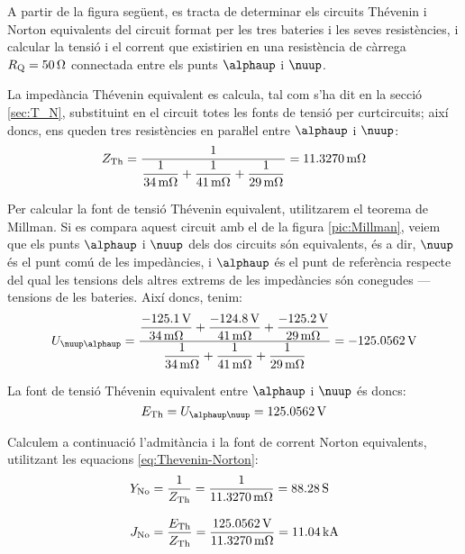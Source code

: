 \begin{exemple}\label{ex:MillmanBateries}
	\addcontentsxms{\MillmanBateries}
    A partir de la figura següent, es tracta de determinar els circuits
    Thévenin i Norton equivalents del circuit format per les tres
    bateries i les seves resistències, i calcular la tensió i el
    corrent que existirien en una resistència de càrrega
    $R_\mathrm{Q}=\qty{50}{\ohm}$ connectada entre els punts $\alphaup$
    i $\nuup$.

    \begin{center}
        
    \end{center}

    La impedància Thévenin equivalent es calcula, tal com s'ha dit en la secció \ref{sec:T_N},
    substituint en el circuit totes les fonts de tensió per curtcircuits; així doncs, ens
    queden tres resistències en paraŀlel entre $\alphaup$ i $\nuup$:
    \[
    Z_\mathrm{Th} = \frac{1}{\dfrac{1}{\qty{34}{\milli\ohm}} +
    \dfrac{1}{\qty{41}{\milli\ohm}} + \dfrac{1}{\qty{29}{\milli\ohm}}} =
    \qty{11,3270}{\milli\ohm}
    \]

    Per calcular la font de tensió Thévenin equivalent, utilitzarem el
    teorema de Millman. Si es compara aquest circuit amb el de la figura
    \vref{pic:Millman}, veiem que els punts $\alphaup$ i $\nuup$ dels dos
    circuits són equivalents, és a dir, $\nuup$ és el punt comú de les
    impedàncies, i $\alphaup$ és el punt de referència respecte del qual les tensions  dels altres extrems de les impedàncies
    són conegudes ---
    tensions de les bateries. Així doncs, tenim:
    \[
    U_{\nuup\alphaup} = \frac{\dfrac{\qty{-125,1}{V}}{\qty{34}{m\ohm}} +
    \dfrac{\qty{-124,8}{V}}{\qty{41}{m\ohm}} +
    \dfrac{\qty{-125,2}{V}}{\qty{29}{m\ohm}}}{\dfrac{1}{\qty{34}{m\ohm}}
    + \dfrac{1}{\qty{41}{m\ohm}} + \dfrac{1}{\qty{29}{m\ohm}}} =
    \qty{-125,0562}{V}
    \]

    La font de tensió  Thévenin equivalent entre $\alphaup$ i $\nuup$ és doncs:
    \[
    E\ped{Th} = U_{\alphaup\nuup} = \qty{125,0562}{V}
    \]

    Calculem a continuació l'admitància i la font de corrent  Norton equivalents, utilitzant
    les equacions \eqref{eq:Thevenin-Norton}:
    \begin{align*}
        Y_\mathrm{No} &= \frac{1}{Z_\mathrm{Th}} = \frac{1}{\qty{11,3270}{m\ohm}} = \qty{88,28}{S}
        \\[2ex]
        J_\mathrm{No} &= \frac{E_\mathrm{Th}}{Z_\mathrm{Th}} =
        \frac{\qty{125,0562}{V}}{\qty{11,3270}{m\ohm}}= \qty{11,04}{kA}
    \end{align*}


\end{exemple}
